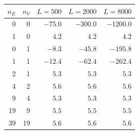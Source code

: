 \begin{tabular}{rrrrr}
\toprule
$n_E$ & $n_V$ & $L=500$ & $L=2000$ & $L=8000$ \\
\midrule
0 & 0 & $-75.0$ & $-300.0$ & $-1200.0$ \\
1 & 0 & $4.2$ & $4.2$ & $4.2$ \\
0 & 1 & $-8.3$ & $-45.8$ & $-195.8$ \\
1 & 1 & $-12.4$ & $-62.4$ & $-262.4$ \\
2 & 1 & $5.3$ & $5.3$ & $5.3$ \\
4 & 2 & $5.6$ & $5.6$ & $5.6$ \\
9 & 4 & $5.3$ & $5.3$ & $5.3$ \\
19 & 9 & $5.5$ & $5.5$ & $5.5$ \\
39 & 19 & $5.6$ & $5.6$ & $5.6$ \\
\bottomrule
\end{tabular}
